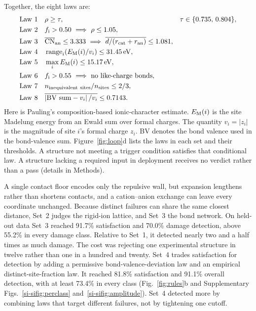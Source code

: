Together, the eight laws are:
\begin{align*}
  \mathrm{Law\ 1}\quad & \rhoc \geq \tau,
    && \tau\in\{0.735,\,0.804\},\\
  \mathrm{Law\ 2}\quad & \fion>0.50 \ \Longrightarrow\ \rhoc\leq1.05,\\
  \mathrm{Law\ 3}\quad & \overline{\mathrm{CN}}_{\mathrm{an}}\leq3.333
    \ \Longrightarrow\
    \overline{d/(r_{\mathrm{cat}}+r_{\mathrm{an}})}\leq1.081,\\
  \mathrm{Law\ 4}\quad & \operatorname{range}_i\!\left(\VM(i)/v_i\right)\leq31.45\,\mathrm{eV},\\
  \mathrm{Law\ 5}\quad & \max_i \VM(i)\leq15.17\,\mathrm{eV},\\
  \mathrm{Law\ 6}\quad & \fion>0.55 \ \Longrightarrow\
    \text{no like-charge bonds},\\
  \mathrm{Law\ 7}\quad &
    n_{\mathrm{inequivalent\ sites}}/n_{\mathrm{sites}}\leq2/3,\\
  \mathrm{Law\ 8}\quad &
    \overline{\left|\mathrm{BV\ sum}-v_i\right|/v_i}\leq0.7143 .
\end{align*}
Here \fion{} is Pauling's composition-based ionic-character estimate. \(E_{\mathrm{M}}(i)\) is the
site Madelung energy from an Ewald sum over formal charges. The quantity
\(v_i=|z_i|\) is the magnitude of site \(i\)'s formal charge \(z_i\). BV denotes the bond
valence used in the bond-valence sum.
Figure~\ref{fig:loop}d lists the laws in each set and their thresholds. A
structure not meeting a trigger condition satisfies that conditional law. A structure
lacking a required input in deployment receives no verdict rather than a pass (details in Methods).

A single contact floor encodes only the repulsive wall, but expansion lengthens rather than
shortens contacts, and a cation--anion exchange can leave every coordinate unchanged. Because
distinct failures can share the same closest distance, Set~2 judges the rigid-ion lattice,
and Set~3 the bond network. On held-out data Set~3 reached
91.7\% satisfaction and 70.0\% damage detection, above 55.2\% in every damage class.
Relative to Set~1, it detected nearly two and a half times as much damage. The cost was
rejecting one experimental structure in twelve rather than one in a hundred and twenty.
Set~4 trades satisfaction for detection by adding a permissive bond-valence-deviation law
and an empirical distinct-site-fraction law. It reached 81.8\% satisfaction and 91.1\%
overall detection, with at least 73.4\% in every class (Fig.~\ref{fig:rules}b and
Supplementary Figs.~\ref{si-sifig:perclass} and~\ref{si-sifig:amplitude}). Set~4 detected more by combining laws that target different failures, not by tightening one
cutoff.

